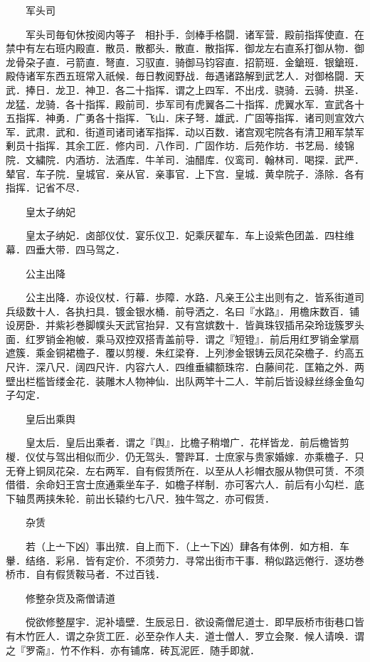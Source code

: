 　　军头司

　　军头司毎旬休按阅内等子　相扑手．剑棒手格闘．诸军营．殿前指挥使直．在禁中有左右班内殿直．散员．散都头．散直．散指挥．御龙左右直系打御从物．御龙骨朶子直．弓箭直．弩直．习驭直．骑御马钧容直．招箭班．金鎗班．银鎗班．殿侍诸军东西五班常入祇候．毎日教阅野战．毎遇诸路解到武艺人．对御格闘．天武．捧日．龙卫．神卫．各二十指挥．谓之上四军．不出戌．骁骑．云骑．拱圣．龙猛．龙骑．各十指挥．殿前司．歩军司有虎翼各二十指挥．虎翼水军．宣武各十五指挥．神勇．广勇各十指挥．飞山．床子弩．雄武．广固等指挥．诸司则宣效六军．武肃．武和．街道司诸司诸军指挥．动以百数．诸宫观宅院各有清卫厢军禁军剰员十指挥．其余工匠．修内司．八作司．广固作坊．后苑作坊．书艺局．绫锦院．文繍院．内酒坊．法酒库．牛羊司．油醋库．仪鸾司．翰林司．喝探．武严．辇官．车子院．皇城官．亲从官．亲事官．上下宫．皇城．黄皁院子．涤除．各有指挥．记省不尽．

　　皇太子纳妃

　　皇太子纳妃．卤部仪仗．宴乐仪卫．妃乘厌翟车．车上设紫色团盖．四柱维幕．四垂大带．四马驾之．

　　公主出降

　　公主出降．亦设仪杖．行幕．歩障．水路．凡亲王公主出则有之．皆系街道司兵级数十人．各执扫具．镀金银水桶．前导洒之．名曰『水路』．用檐床数百．铺设房卧．并紫衫巻脚幞头天武官抬舁．又有宫嫔数十．皆眞珠钗插吊朶玲珑簇罗头面．红罗销金袍帔．乘马双控双搭青盖前导．谓之『短镫』．前后用红罗销金掌扇遮簇．乘金铜裙檐子．覆以剪椶．朱红梁脊．上列渗金银铸云凤花朶檐子．约高五尺许．深八尺．阔四尺许．内容六人．四维垂繍额珠帘．白藤间花．匡箱之外．两壁出栏槛皆缕金花．装雕木人物神仙．出队两竿十二人．竿前后皆设緑丝绦金鱼勾子勾定．

　　皇后出乘舆

　　皇太后．皇后出乘者．谓之『舆』．比檐子稍増广．花样皆龙．前后檐皆剪椶．仪仗与驾出相似而少．仍无驾头．警跸耳．士庶家与贵家婚嫁．亦乘檐子．只无脊上铜凤花朶．左右两军．自有假赁所在．以至从人衫帽衣服从物倶可赁．不须借徣．余命妇王宫士庶通乘坐车子．如檐子样制．亦可客六人．前后有小勾栏．底下轴贯两挟朱轮．前出长辕约七八尺．独牛驾之．亦可假赁．

　　杂赁

　　若（上亠下凶）事出殡．自上而下．（上亠下凶）肆各有体例．如方相．车轝．结络．彩帛．皆有定价．不须劳力．寻常出街市干事．稍似路远倦行．逐坊巻桥市．自有假赁鞍马者．不过百钱．

　　修整杂货及斋僧请道

　　傥欲修整屋宇．泥补墙壁．生辰忌日．欲设斋僧尼道士．即早辰桥市街巷口皆有木竹匠人．谓之杂货工匠．必至杂作人夫．道士僧人．罗立会聚．候人请唤．谓之『罗斋』．竹不作料．亦有铺席．砖瓦泥匠．随手即就．

